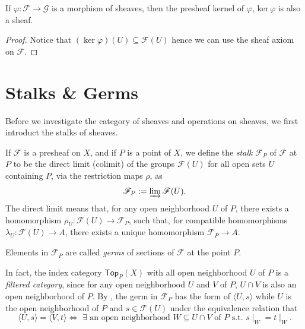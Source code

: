\documentclass[11pt]{article}
\begin{document}
\begin{lemma}
    If $\varphi: \mathscr{F} \to \mathscr{G}$ is a morphism 
    of sheaves, then the presheaf kernel of $\varphi$, 
    $\mathrm{ker}\,\varphi$ is also a sheaf. 
\end{lemma}

\begin{proof}
    Notice that $ (\ker \varphi) (U)  \subseteq \mathscr{F}(U) $ 
    hence we can use the sheaf axiom on $ \mathscr{F} $. 
\end{proof}

\section{Stalks \& Germs}

Before we investigate the category of sheaves and operations on 
sheaves, we first introduct the stalks of sheaves. 

\begin{definition}[Stalks]
    If $\mathscr{F}$ is a presheaf on $X$, and if $P$ is a point 
    of $X$, we define the \emph{stalk} $\mathscr{F}_{P}$ of 
    $\mathscr{F}$ at $P$ to be the direct limit (colimit) 
    of the groups $\mathscr{F}(U)$ for all open sets $U$ 
    containing $P$, via the restriction maps 
    $\rho$, as 
    $$\mathscr{F}_{P}:= \varinjlim \mathscr{F}(U).$$
    The direct limit means that, for any open neighborhood $ U $ 
    of $ P $, there exists a homomorphism 
    $ \rho_{U} : \mathscr{F}(U) \to \mathscr{F}_{P}$, 
    such that, for compatible homomorphisms $ \lambda_{U}: \mathscr{F}(U) \to A $, 
    there exists a unique homomorphism $ \mathscr{F}_{P} \to A $. 

    Elements in $ \mathscr{F}_{P} $ are called 
    \emph{germs} of sections of $ \mathscr{F} $ at the point $ P $. 

    In fact, the index category $\mathsf{Top}_{P}(X)$ 
    with all open neighborhood $U$ of $P$ is 
    a \emph{filtered category}, since for any open neighborhood 
    $ U $ and $ V $ of $ P $, $ U \cap V $ is also an open 
    neighborhood of $ P $. 
    By \cite[1.4 D]{vakilTheRisingSea}, 
    the germ in $\mathscr{F}_{P}$ has the form of $\langle U,s \rangle$ 
    while $ U $  is the open neighborhood of $P$ and 
    $s \in \mathscr{F}(U)$ under the equivalence relation
     that 
    $$\langle U,s \rangle = \langle V,t \rangle \Longleftrightarrow 
    \,\,\exists\text{ an open neighborhood }W\subseteq U \cap V 
    \text{ of }P \text{ s.t. } s\mid_{W}=t\mid_{W}.$$ 
\end{definition}
\end{document}
